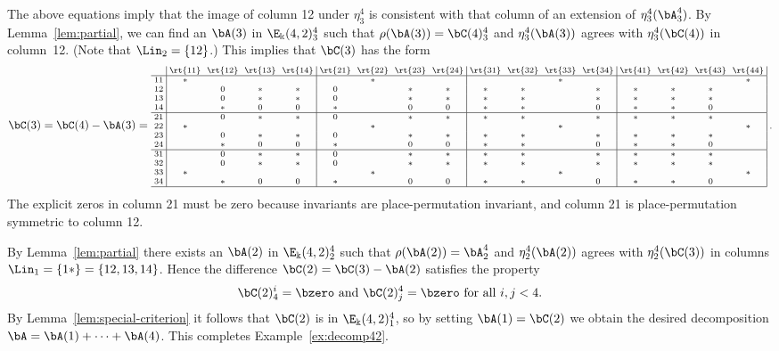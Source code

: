 \begin{exam}
The above equations imply that the image of column 12 under $\eta^4_3$
is consistent with that column of an extension of
$\eta^4_3(\bA^4_3)$. By Lemma~\ref{lem:partial}, we can find an
$\bA(3)$ in $\E_\Bbbk(4,2)^4_3$ such that $\rho(\bA(3)) = \bC(4)^4_3$
and $\eta^4_3 (\bA(3))$ agrees with $\eta^4_3(\bC(4))$ in column~12. 
(Note that $\Lin_2=\{12\}$.) This implies that $\bC(3)$ has the form
\[
\bC(3) = \bC(4) - \bA(3) = 
\text{\setlength{\arraycolsep}{2.7pt}\scriptsize
$\displaystyle 
\begin{array}{c|cccc|cccc|cccc|cccc|}
 &\rt{11}&\rt{12}&\rt{13}&\rt{14}&\rt{21}&\rt{22}&\rt{23}&\rt{24}&
 \rt{31}&\rt{32}&\rt{33}&\rt{34}&\rt{41}&\rt{42}&\rt{43}&\rt{44}\\ \hline
 11&*& & & & &*& & & & &*& & & & &*\\
 12& &0&*&*&0& &*&*&*&*& &*&*&*&* & \\
 13& &0&*&*&0& &*&*&*&*& &*&*&*&*& \\
 14& &*&0&0&*& &0&0&*&*& &0&*&*&0& \\ \hline
 21& &0&*&*&0& &*&*&*&*& &*&*&*&*& \\ 
 22&*& & & & &*& & & & &*& & & & &*\\
 23& &0&*&*&0& &*&*&*&*& &*&*&*&*& \\ 
 24& &*&0&0&*& &0&0&*&*& &0&*&*&0& \\ \hline 
 31& &0&*&*&0& &*&*&*&*& &*&*&*&*& \\
 32& &0&*&*&0& &*&*&*&*& &*&*&*&*& \\
 33&*& & & & &*& & & & &*& & & & &*\\ 
 34& &*&0&0&*& &0&0&*&*& &0&*&*&0& \\ \hline
 \end{array} \; .$}
\]
The explicit zeros in column 21 must be zero because invariants are
place-permutation invariant, and column 21 is place-permutation
symmetric to column 12.

By Lemma~\ref{lem:partial} there exists an $\bA(2)$ in
$\E_\Bbbk(4,2)^4_2$ such that $\rho(\bA(2)) = \bA^4_2$ and $\eta^4_2
(\bA(2))$ agrees with $\eta^4_2(\bC(3))$ in columns $\Lin_1 = \{1*\} =
\{12, 13, 14\}$. Hence the difference $\bC(2) = \bC(3) - \bA(2)$
satisfies the property
\[
\text{$\bC(2)^i_4 = \bzero$ and $\bC(2)^4_j = \bzero$ for all $i, j
 <4$.}
\]
By Lemma~\ref{lem:special-criterion} it follows that $\bC(2)$ is
in $\E_\Bbbk(4,2)^4_1$, so by setting $\bA(1) = \bC(2)$ we obtain the
desired decomposition $\bA = \bA(1)+ \cdots + \bA(4)$. This completes
Example~\ref{ex:decomp42}.
\end{exam}

